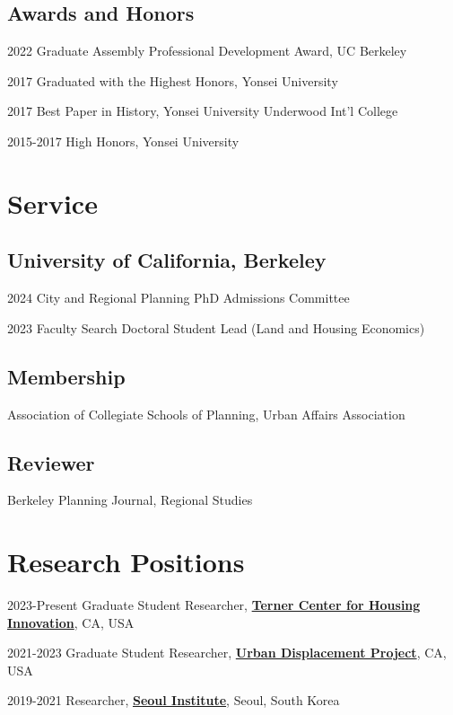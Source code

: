 \documentclass[12pt,letterpaper]{report}
\begin{document}
    \subsection*{Awards and Honors}
    \begin{tablist}
        \item[2022] \tab{}Graduate Assembly Professional Development Award, UC Berkeley
        \item[2017] \tab{}Graduated with the Highest Honors, Yonsei University
        \item[2017] \tab{}Best Paper in History, Yonsei University Underwood Int'l College
        \item[2015-2017] \tab{}High Honors, Yonsei University
    \end{tablist}

  \section*{Service}
  \subsection*{University of California, Berkeley}
    \begin{tablist}
        \item[2024] \tab{}City and Regional Planning PhD Admissions Committee
        \item[2023] \tab{}Faculty Search Doctoral Student Lead (Land and Housing Economics)
    \end{tablist}
  \subsection*{Membership}
    Association of Collegiate Schools of Planning, Urban Affairs Association
  \subsection*{Reviewer}
    Berkeley Planning Journal, Regional Studies

    \section*{Research Positions}
    \begin{tablist}
        \item[2023-Present] \tab{}Graduate Student Researcher, \href{https://ternercenter.berkeley.edu/}{\textbf{Terner Center for Housing Innovation}}, CA, USA
        \item[2021-2023] \tab{}Graduate Student Researcher, \href{https://www.urbandisplacement.org/}{\textbf{Urban Displacement Project}}, CA, USA
        \item[2019-2021] \tab{}Researcher, \href{si.re.kr}{\textbf{Seoul Institute}}, Seoul, South Korea
    \end{tablist}
\end{document}
